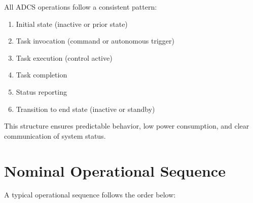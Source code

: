 \documentclass[letterpaper,11pt,oneside,english]{scrreprt}
\begin{document}
	All ADCS operations follow a consistent pattern:
	
	\begin{enumerate}
		\item Initial state (inactive or prior state)
		\item Task invocation (command or autonomous trigger)
		\item Task execution (control active)
		\item Task completion
		\item Status reporting
		\item Transition to end state (inactive or standby)
	\end{enumerate}
	
	This structure ensures predictable behavior, low power consumption, and clear communication of system status.
	
	\section{Nominal Operational Sequence}
	
	A typical operational sequence follows the order below:
	
\end{document}
